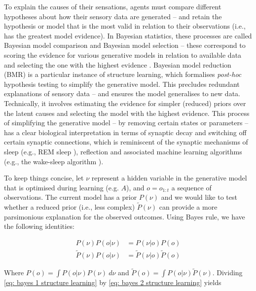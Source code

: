 \documentclass[review,12pt,authoryear]{elsarticle}
\begin{document}
To explain the causes of their sensations, agents must compare different hypotheses about how their sensory data are generated – and retain the hypothesis or model that is the most valid in relation to their observations (i.e., has the greatest model evidence). In Bayesian statistics, these processes are called Bayesian model comparison and Bayesian model selection -- these correspond to scoring the evidence for various generative models in relation to available data and selecting the one with the highest evidence \citep{claeskensModelSelectionModel2006,stephanBayesianModelSelection2009}.
Bayesian model reduction (BMR) is a particular instance of structure learning, which formalises \textit{post-hoc} hypothesis testing to simplify the generative model. This precludes redundant explanations of sensory data – and ensures the model generalises to new data. Technically, it involves estimating the evidence for simpler (reduced) priors over the latent causes and selecting the model with the highest evidence. This process of simplifying the generative model -- by removing certain states or parameters -- has a clear biological interpretation in terms of synaptic decay and switching off certain synaptic connections, which is reminiscent of the synaptic mechanisms of sleep (e.g., REM sleep \citep{hobsonWakingDreamingConsciousness2012,hobsonVirtualRealityConsciousness2014}), reflection and associated machine learning algorithms (e.g., the wake-sleep algorithm \citep{hintonWakesleepAlgorithmUnsupervised1995}).

To keep things concise, let $\nu$ represent a hidden variable in the generative model that is optimised during learning (e.g. $A$), and $o=o_{1:t}$ a sequence of observations. The current model has a prior $P(\nu)$ and we would like to test whether a reduced prior (i.e., less complex) $\tilde P(\nu)$ can provide a more parsimonious explanation for the observed outcomes. Using Bayes rule, we have the following identities:

\begin{align}
P(\nu)P(o|\nu)&= P(\nu |o)P(o) \label{eq: bayes 1 structure learning}\\ 
\tilde P(\nu)P(o|\nu)&= \tilde P(\nu |o)\tilde P(o) \label{eq: bayes 2 structure learning}
\end{align}

Where $P(o)=\int P(o|\nu)P(\nu) \: d\nu$ and $\tilde P(o)=\int P(o|\nu) \tilde P(\nu)$. Dividing \eqref{eq: bayes 1 structure learning} by \eqref{eq: bayes 2 structure learning} yields
	 
\end{document}
